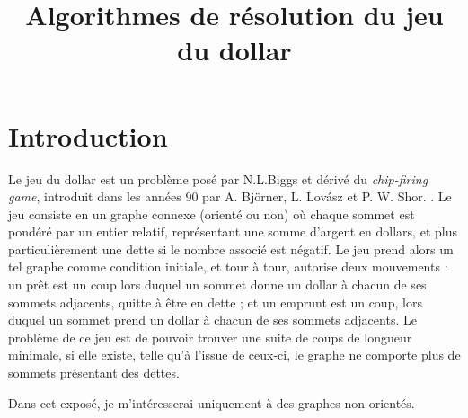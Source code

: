 \documentclass{article}
\title{Algorithmes de résolution du jeu du dollar}
\author{}
\date{}
\begin{document}
\maketitle

\tableofcontents

\section{Introduction}

Le jeu du dollar est un problème posé par N.L.Biggs \cite{1} et dérivé du \textit{chip-firing game}, introduit dans les années 90 par A. Björner, L. Lovász et P. W. Shor. \cite{2}. 
Le jeu consiste en un graphe connexe (orienté ou non) où chaque sommet est pondéré par un entier relatif, représentant une somme d'argent en dollars, et plus particulièrement une dette si le nombre associé est négatif.
Le jeu prend alors un tel graphe comme condition initiale, et tour à tour, autorise deux mouvements :
un prêt est un coup lors duquel un sommet donne un dollar à chacun de ses sommets adjacents, quitte à être en dette ; et un emprunt est un coup, lors duquel un sommet prend un dollar à chacun de ses sommets adjacents.
Le problème de ce jeu est de pouvoir trouver une suite de coups de longueur minimale, si elle existe, telle qu'à l'issue de ceux-ci, le graphe ne comporte plus de sommets présentant des dettes.

Dans cet exposé, je m'intéresserai uniquement à des graphes non-orientés.
\end{document}
